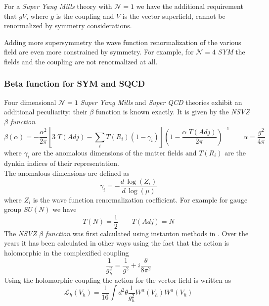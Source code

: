 For a \emph{Super Yang Mills} theory with $\mathcal{N} = 1$ we have the additional requirement that $g V$, where $g$ is the coupling and $V$ is the vector superfield, cannot be renormalized by symmetry considerations. 

Adding more supersymmetry the wave function renormalization of the various field are even more constrained by symmetry.
For example, for $\mathcal{N}=4$ \emph{SYM}  the fields and the coupling are not renormalized at all.


\subsubsection{Beta function for SYM and SQCD}
Four dimensional $\mathcal{N} =  1 $ \emph{Super Yang Mills} and \emph{Super QCD} theories exhibit an additional peculiarity: their $\beta$ function is known exactly.
It is given by the \emph{NSVZ $\beta$ function} 
\begin{equation}
  \beta (\alpha) = - \frac{\alpha^2}{2 \pi} \left[ 3 \; T(Adj) - \sum_i T( R_i) ( 1 - \gamma_i ) \right]  \left( 1 - \frac{ \alpha \; T(Adj)  }{2 \pi} \right)^{-1} \qquad \alpha = \frac{g^2}{4 \pi}
\label{beta-exact}
\end{equation} 
where $\gamma_i$ are the anomalous dimensions of the matter fields and $T(R_i)$ are the dynkin indices of their representation.\\
The anomalous dimensions are defined as
\begin{equation}
 \gamma_i = - \frac{d \, \log(Z_i) }{d \, \log( \mu)}
\end{equation}
where $Z_i$ is the wave function renormalization coefficient.
For example for gauge group $SU(N)$ we have
\begin{equation*}
 T(N) = \frac{1}{2} \qquad T(Adj) = N 
\end{equation*}
The \emph{NSVZ $\beta$ function} was first calculated using instanton methods in \cite{Novikov:1985rd}. 
Over the years it has been calculated in other ways using the fact that the action is holomorphic in the complexified coupling
\begin{equation}
	\frac{1}{g_h^2} = \frac{1}{g^2 } + i \frac{\theta}{8 \pi^2} 
\end{equation}
Using the holomorphic coupling the action for the vector field is written as
\begin{equation}
 \mathcal{L}_h ( V_h) = \frac{1}{16} \int d^2 \theta \frac{1}{g_h^2} W^a ( V_h) W^a(V_h) 
\end{equation}
